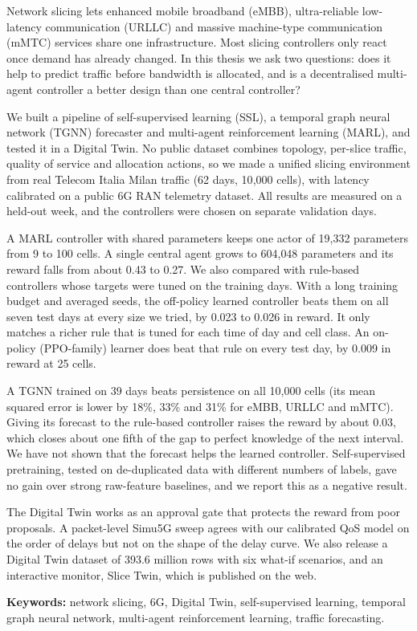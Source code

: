 Network slicing lets enhanced mobile broadband (eMBB), ultra-reliable low-latency communication (URLLC) and massive machine-type communication (mMTC) services share one infrastructure. Most slicing controllers only react once demand has already changed. In this thesis we ask two questions: does it help to predict traffic before bandwidth is allocated, and is a decentralised multi-agent controller a better design than one central controller?

We built a pipeline of self-supervised learning (SSL), a temporal graph neural network (TGNN) forecaster and multi-agent reinforcement learning (MARL), and tested it in a Digital Twin. No public dataset combines topology, per-slice traffic, quality of service and allocation actions, so we made a unified slicing environment from real Telecom Italia Milan traffic (62 days, 10{,}000 cells), with latency calibrated on a public 6G RAN telemetry dataset. All results are measured on a held-out week, and the controllers were chosen on separate validation days.

A MARL controller with shared parameters keeps one actor of 19{,}332 parameters from 9 to 100 cells. A single central agent grows to 604{,}048 parameters and its reward falls from about 0.43 to 0.27. We also compared with rule-based controllers whose targets were tuned on the training days. With a long training budget and averaged seeds, the off-policy learned controller beats them on all seven test days at every size we tried, by 0.023 to 0.026 in reward. It only matches a richer rule that is tuned for each time of day and cell class. An on-policy (PPO-family) learner does beat that rule on every test day, by 0.009 in reward at 25 cells.

A TGNN trained on 39 days beats persistence on all 10{,}000 cells (its mean squared error is lower by 18\%, 33\% and 31\% for eMBB, URLLC and mMTC). Giving its forecast to the rule-based controller raises the reward by about 0.03, which closes about one fifth of the gap to perfect knowledge of the next interval. We have not shown that the forecast helps the learned controller. Self-supervised pretraining, tested on de-duplicated data with different numbers of labels, gave no gain over strong raw-feature baselines, and we report this as a negative result.

The Digital Twin works as an approval gate that protects the reward from poor proposals. A packet-level Simu5G sweep agrees with our calibrated QoS model on the order of delays but not on the shape of the delay curve. We also release a Digital Twin dataset of 393.6 million rows with six what-if scenarios, and an interactive monitor, Slice Twin, which is published on the web.

\vspace{0.4cm}
\noindent \textbf{Keywords:} network slicing, 6G, Digital Twin, self-supervised learning, temporal graph neural network, multi-agent reinforcement learning, traffic forecasting.
